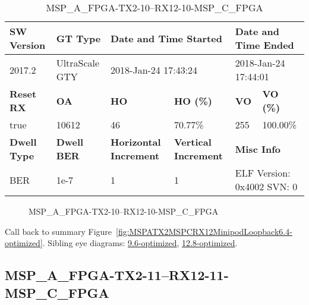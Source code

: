 \begin{table}[h]
\centering
\caption{MSP\_A\_FPGA-TX2-10--RX12-10-MSP\_C\_FPGA}
\label{tab:MSPAFPGATX210RX1210MSPCFPGA6.4-optimized}
\begin{tabular}{@{}|l|l|l|l|l|l|@{}}
\toprule
\textbf{SW Version}                & \textbf{GT Type}   & \multicolumn{2}{l|}{\textbf{Date and Time Started}}            & \multicolumn{2}{l|}{\textbf{Date and Time Ended}}        \\ \midrule
2017.2                       & UltraScale GTY          & \multicolumn{2}{l|}{2018-Jan-24 17:43:24}                   & \multicolumn{2}{l|}{2018-Jan-24 17:44:01}               \\ \midrule
\textbf{Reset RX}                  & \textbf{OA} & \textbf{HO}   & \textbf{HO (\%)} & \textbf{VO} & \textbf{VO (\%)} \\ \midrule
true & 10612        & 46          & 70.77\%        & 255        & 100.00\%       \\ \midrule
\textbf{Dwell Type}                & \textbf{Dwell BER} & \textbf{Horizontal Increment} & \textbf{Vertical Increment}    & \multicolumn{2}{l|}{\textbf{Misc Info}}                  \\ \midrule
BER                            & 1e-7        & 1        & 1           & \multicolumn{2}{l|}{ELF Version: 0x4002 SVN: 0}                         \\ \bottomrule
\end{tabular}
\end{table}

\begin{figure}[h]
\caption{MSP\_A\_FPGA-TX2-10--RX12-10-MSP\_C\_FPGA} \label{fig:MSPAFPGATX210RX1210MSPCFPGA6.4-optimized}
\end{figure}

Call back to summary Figure~\ref{fig:MSPATX2MSPCRX12MinipodLoopback6.4-optimized}.
Sibling eye diagrams: \hyperref[sec:MSPAFPGATX210RX1210MSPCFPGA9.6-optimized]{9.6-optimized}, \hyperref[sec:MSPAFPGATX210RX1210MSPCFPGA12.8-optimized]{12.8-optimized}.

\clearpage
\newpage


\subsection{MSP\_A\_FPGA-TX2-11--RX12-11-MSP\_C\_FPGA}\label{sec:MSPAFPGATX211RX1211MSPCFPGA6.4-optimized}


